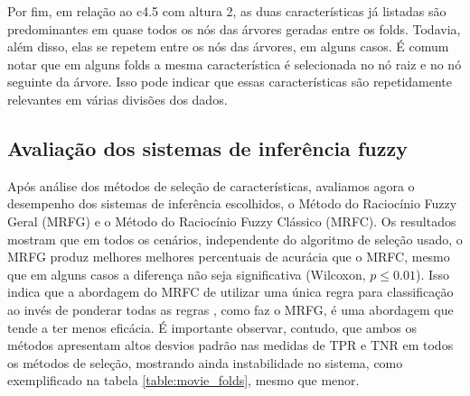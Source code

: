 \documentclass[template.tex]{subfiles}
\begin{document}

Por fim, em relação ao c4.5 com altura 2, as duas características já listadas são predominantes em quase todos os nós das árvores geradas entre os folds. Todavia, além disso, elas se repetem entre os nós das árvores, em alguns casos. É comum notar que em alguns folds a mesma característica é selecionada no nó raiz e no nó seguinte da árvore. Isso pode indicar que essas características são repetidamente relevantes em várias divisões dos dados. 

%
%
%


\subsection{Avaliação dos sistemas de inferência fuzzy}

Após análise dos métodos de seleção de características, avaliamos agora o desempenho dos sistemas de inferência escolhidos, o Método do Raciocínio Fuzzy Geral (MRFG) e o Método do Raciocínio Fuzzy Clássico (MRFC). Os resultados mostram que em todos os cenários, independente do algoritmo de seleção usado, o MRFG produz melhores melhores percentuais de acurácia que o MRFC, mesmo que em alguns casos a diferença não seja significativa (Wilcoxon, $p\leq0.01$). Isso indica que a abordagem do MRFC de utilizar uma única regra para classificação ao invés de ponderar todas as regras , como faz o MRFG, é uma abordagem que tende a ter menos eficácia. É importante observar, contudo, que ambos os métodos apresentam altos desvios padrão nas medidas de TPR e TNR em todos os métodos de seleção, mostrando ainda instabilidade no sistema, como exemplificado na tabela \ref{table:movie_folds}, mesmo que menor. 
\end{document}
